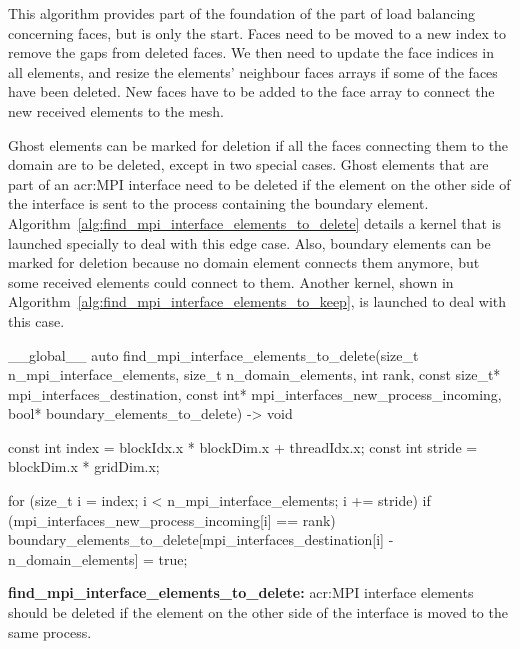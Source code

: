 This algorithm provides part of the foundation of the part of load balancing concerning faces, but
is only the start. Faces need to be moved to a new index to remove the gaps from deleted faces. We
then need to update the face indices in all elements, and resize the elements' neighbour faces
arrays if some of the faces have been deleted. New faces have to be added to the face array to
connect the new received elements to the mesh.

Ghost elements can be marked for deletion if all the faces connecting them to the domain are to be
deleted, except in two special cases. Ghost elements that are part of an \acrshort{acr:MPI}
interface need to be deleted if the element on the other side of the interface is sent to the
process containing the boundary element. Algorithm~\ref{alg:find_mpi_interface_elements_to_delete}
details a kernel that is launched specially to deal with this edge case. Also, boundary elements can
be marked for deletion because no domain element connects them anymore, but some received elements
could connect to them. Another kernel, shown in
Algorithm~\ref{alg:find_mpi_interface_elements_to_keep}, is launched to deal with this case.

\begin{algorithm}[H]
    \begin{cuda}
        __global__
        auto find_mpi_interface_elements_to_delete(size_t n_mpi_interface_elements, 
                size_t n_domain_elements, int rank, 
                const size_t* mpi_interfaces_destination, 
                const int* mpi_interfaces_new_process_incoming, 
                bool* boundary_elements_to_delete) -> void {

            const int index = blockIdx.x * blockDim.x + threadIdx.x;
            const int stride = blockDim.x * gridDim.x;

            for (size_t i = index; i < n_mpi_interface_elements; i += stride) {
                if (mpi_interfaces_new_process_incoming[i] == rank) {
                    boundary_elements_to_delete[mpi_interfaces_destination[i] 
                                              - n_domain_elements] = true;
                }
            }
        }\end{cuda}
\caption{\textbf{find\_mpi\_interface\_elements\_to\_delete:} \Acrshort{acr:MPI} interface elements should be deleted if the element on the other side of the interface is moved to the same process.}\label{alg:find_mpi_interface_elements_to_delete}
\end{algorithm}

